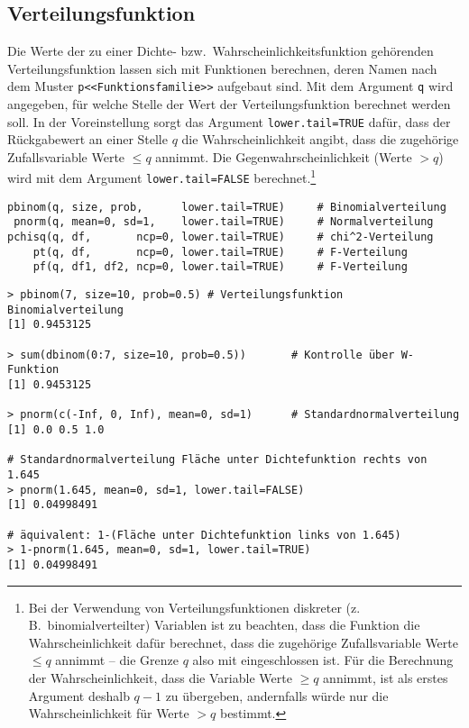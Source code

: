 \subsection{Verteilungsfunktion}
\label{sec:distrFunc}

Die Werte der zu einer Dichte- bzw.\ Wahrscheinlichkeitsfunktion gehörenden Verteilungsfunktion lassen sich mit Funktionen berechnen, deren Namen nach dem Muster \lstinline!p<<Funktionsfamilie>>! aufgebaut sind. Mit dem Argument \lstinline!q! wird angegeben, für welche Stelle der Wert der Verteilungsfunktion berechnet werden soll. In der Voreinstellung sorgt das Argument \lstinline!lower.tail=TRUE! dafür, dass der Rückgabewert an einer Stelle $q$ die Wahrscheinlichkeit angibt, dass die zugehörige Zufallsvariable Werte $\leq q$ annimmt. Die Gegenwahrscheinlichkeit (Werte $> q$) wird mit dem Argument \lstinline!lower.tail=FALSE! berechnet.\footnote{\label{ftn:distrFuncDiscr}Bei der Verwendung von Verteilungsfunktionen diskreter (z.\,B.\ binomialverteilter) Variablen ist zu beachten, dass die Funktion die Wahrscheinlichkeit dafür berechnet, dass die zugehörige Zufallsvariable Werte $\leq q$ annimmt -- die Grenze $q$ also mit eingeschlossen ist. Für die Berechnung der Wahrscheinlichkeit, dass die Variable Werte $\geq q$ annimmt, ist als erstes Argument deshalb $q-1$ zu übergeben, andernfalls würde nur die Wahrscheinlichkeit für Werte $> q$ bestimmt.}
\begin{lstlisting}
pbinom(q, size, prob,      lower.tail=TRUE)     # Binomialverteilung
 pnorm(q, mean=0, sd=1,    lower.tail=TRUE)     # Normalverteilung
pchisq(q, df,       ncp=0, lower.tail=TRUE)     # chi^2-Verteilung
    pt(q, df,       ncp=0, lower.tail=TRUE)     # F-Verteilung
    pf(q, df1, df2, ncp=0, lower.tail=TRUE)     # F-Verteilung
\end{lstlisting}

\begin{lstlisting}
> pbinom(7, size=10, prob=0.5) # Verteilungsfunktion Binomialverteilung
[1] 0.9453125

> sum(dbinom(0:7, size=10, prob=0.5))       # Kontrolle über W-Funktion
[1] 0.9453125

> pnorm(c(-Inf, 0, Inf), mean=0, sd=1)      # Standardnormalverteilung
[1] 0.0 0.5 1.0

# Standardnormalverteilung Fläche unter Dichtefunktion rechts von 1.645
> pnorm(1.645, mean=0, sd=1, lower.tail=FALSE)
[1] 0.04998491

# äquivalent: 1-(Fläche unter Dichtefunktion links von 1.645)
> 1-pnorm(1.645, mean=0, sd=1, lower.tail=TRUE)
[1] 0.04998491
\end{lstlisting}

